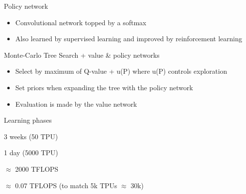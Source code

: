 \begin{frame}{Policy network}
  \begin{minipage}[c]{0.50\linewidth}
  \end{minipage}\hfill
  \begin{minipage}[c]{0.49\linewidth}
    \begin{itemize}[<+->]
      \item Convolutional network topped by a softmax
      \item Also learned by supervised learning and improved by reinforcement learning
    \end{itemize}
  \end{minipage}\hfill
\end{frame}

\begin{frame}{Monte-Carlo Tree Search + value \& policy networks}
  \begin{itemize}[<+->]
    \item Select by maximum of Q-value + u(P) where u(P) controls exploration
    \item Set priors when expanding the tree with the policy network
    \item Evaluation is made by the value network
  \end{itemize}
\end{frame}

\begin{frame}{Learning phases}
  \begin{description}[<+->]
    \item[Supervised] 3 weeks (50 TPU) 
    \item[Reinforcement] 1 day (5000 TPU)
  \end{description}


  \begin{description}[<+->]
    \item[50 TPU] $\approx$ 2000 TFLOPS
    \item[Core i7] $\approx$ 0.07 TFLOPS (to match 5k TPUs $\approx$ 30k)
  \end{description}
\end{frame}

